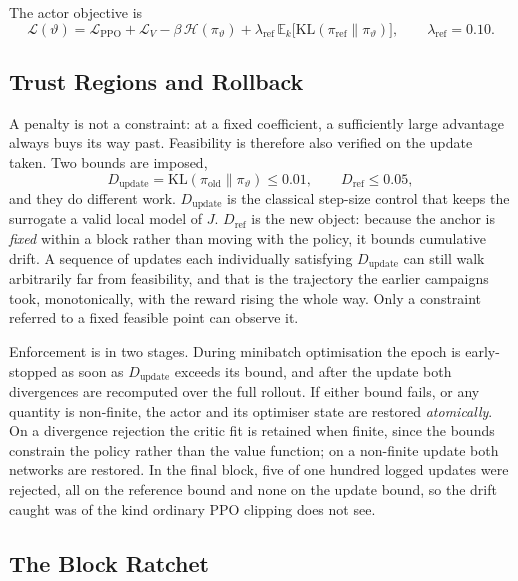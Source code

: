 The actor objective is
%
\begin{equation}
  \label{eq:ctrl:anchored-loss}
  \mathcal{L}(\vartheta)
  = \mathcal{L}_{\mathrm{PPO}}
  + \mathcal{L}_{V}
  - \beta\,\mathcal{H}(\pi_\vartheta)
  + \lambda_{\mathrm{ref}}\,
    \mathbb{E}_k\bigl[\mathrm{KL}(\pi_{\mathrm{ref}} \| \pi_\vartheta)\bigr],
  \qquad
  \lambda_{\mathrm{ref}} = 0.10 .
\end{equation}

\subsection{Trust Regions and Rollback}

A penalty is not a constraint: at a fixed coefficient, a sufficiently large
advantage always buys its way past. Feasibility is therefore also verified on the update taken. Two bounds are imposed,
%
\begin{equation}
  \label{eq:ctrl:bounds}
  D_{\mathrm{update}} = \mathrm{KL}(\pi_{\mathrm{old}} \| \pi_\vartheta)
  \le 0.01,
  \qquad
  D_{\mathrm{ref}} \le 0.05,
\end{equation}
%
and they do different work. $D_{\mathrm{update}}$ is the classical step-size
control that keeps the surrogate a valid local model of $J$.
$D_{\mathrm{ref}}$ is the new object: because the anchor is \emph{fixed} within
a block rather than moving with the policy, it bounds cumulative drift. A
sequence of updates each individually satisfying $D_{\mathrm{update}}$ can
still walk arbitrarily far from feasibility, and that is the trajectory the earlier campaigns took, monotonically, with the reward rising the whole
way. Only a constraint referred to a fixed feasible point can observe it.

Enforcement is in two stages. During minibatch optimisation the epoch is
early-stopped as soon as $D_{\mathrm{update}}$ exceeds its bound, and after the
update both divergences are recomputed over the full rollout. If either bound
fails, or any quantity is non-finite, the actor and its optimiser state are
restored \emph{atomically}. On a divergence rejection the critic fit is retained
when finite, since the bounds constrain the policy rather than the value
function; on a non-finite update both networks are restored. In the final block,
five of one hundred logged updates were rejected, all on the reference bound and
none on the update bound, so the drift caught was of the kind ordinary PPO
clipping does not see.

\subsection{The Block Ratchet}

